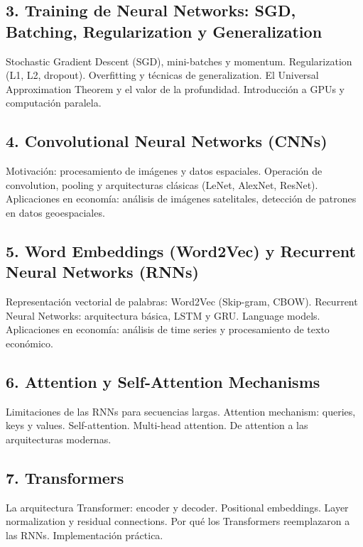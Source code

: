 \documentclass[11pt,a4paper]{article}
\begin{document}
\subsection*{3. Training de Neural Networks: SGD, Batching, Regularization y Generalization}

Stochastic Gradient Descent (SGD), mini-batches y momentum. Regularization (L1, L2, dropout). Overfitting y t\'ecnicas de generalization. El Universal Approximation Theorem y el valor de la profundidad. Introducci\'on a GPUs y computaci\'on paralela.

\subsection*{4. Convolutional Neural Networks (CNNs)}

Motivaci\'on: procesamiento de im\'agenes y datos espaciales. Operaci\'on de convolution, pooling y arquitecturas cl\'asicas (LeNet, AlexNet, ResNet). Aplicaciones en econom\'ia: an\'alisis de im\'agenes satelitales, detecci\'on de patrones en datos geoespaciales.

\subsection*{5. Word Embeddings (Word2Vec) y Recurrent Neural Networks (RNNs)}

Representaci\'on vectorial de palabras: Word2Vec (Skip-gram, CBOW). Recurrent Neural Networks: arquitectura b\'asica, LSTM y GRU. Language models. Aplicaciones en econom\'ia: an\'alisis de time series y procesamiento de texto econ\'omico.

\subsection*{6. Attention y Self-Attention Mechanisms}

Limitaciones de las RNNs para secuencias largas. Attention mechanism: queries, keys y values. Self-attention. Multi-head attention. De attention a las arquitecturas modernas.

\subsection*{7. Transformers}

La arquitectura Transformer: encoder y decoder. Positional embeddings. Layer normalization y residual connections. Por qu\'e los Transformers reemplazaron a las RNNs. Implementaci\'on pr\'actica.
\end{document}
